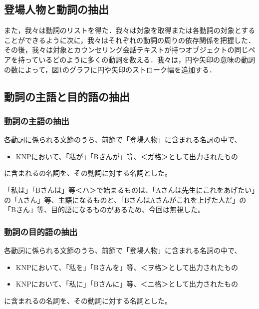 \documentclass[shuuron]{kuee}
\begin{document}
  \subsection{登場人物と動詞の抽出}

  また，我々は動詞のリストを得た．我々は対象を取得または各動詞の対象とすることができるように次に，我々はそれぞれの動詞の周りの依存関係を把握した．
  その後，我々は対象とカウンセリング会話テキストが持つオブジェクトの同じペアを持っているどのように多くの動詞を数える．我々は，円や矢印の意味の動詞の数によって，図1のグラフに円や矢印のストローク幅を追加する．

  \subsection{動詞の主語と目的語の抽出}

\subsubsection{動詞の主語の抽出}


各動詞に係られる文節のうち、前節で「登場人物」に含まれる名詞の中で、

\begin{itemize}

\item KNPにおいて、「私が」「Bさんが」等、＜ガ格＞として出力されたもの
\end{itemize}
に含まれるの名詞を、その動詞に対する名詞とした。

「私は」「Bさんは」等＜ハ＞で始まるものは、「Aさんは先生にこれをあげたい」の「Aさん」等、主語になるものと、「BさんはAさんがこれを上げた人だ」の「Bさん」等、目的語になるものがあるため、今回は無視した。

\subsubsection{動詞の目的語の抽出}


各動詞に係られる文節のうち、前節で「登場人物」に含まれる名詞の中で、

\begin{itemize}

\item KNPにおいて、「私を」「Bさんを」等、＜ヲ格＞として出力されたもの
\item KNPにおいて、「私に」「Bさんに」等、＜ニ格＞として出力されたもの
\end{itemize}
に含まれるの名詞を、その動詞に対する名詞とした。
\end{document}
